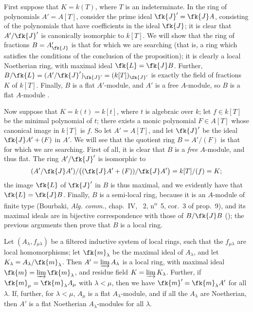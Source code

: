 \begin{env}[10.3.1.1]
\label{0.10.3.1.1}
First suppose that $K=k(T)$, where $T$ is an indeterminate.
In the ring of polynomials $A'=A[T]$, consider the prime ideal $\fk{J}'=\fk{J}A$, consisting of the
polynomials that have coefficients in the ideal $\fk{J}$;
it is clear that $A'/\fk{J}'$ is canonically isomorphic to $k[T]$.
We will show that the ring of fractions $B=A'_\fk{J}$ is that for which we are searching (that is, a ring which satisfies the conditions of the conclusion of the proposition);
it is clearly a local Noetherian ring, with maximal ideal $\fk{L}=\fk{J}B$.
Further, $B/\fk{L}=(A'/\fk{J}')_{\fk{J}'}=(k[T])_{\fk{J}'}$ is exactly the field of fractions $K$ of $k[T]$.
Finally, $B$ is a flat $A'$-module, and $A'$ is a free $A$-module, so $B$ is a flat $A$-module .
\end{env}

\begin{env}[10.3.1.2]
\label{0.10.3.1.2}
Now suppose that $K=k(t)=k[t]$, where $t$ is algebraic over $k$;
let $f\in k[T]$ be the minimal polynomial of $t$;
there exists a monic polynomial $F\in A[T]$ whose canonical image in $k[T]$ is $f$.
So let $A'=A[T]$, and let $\fk{J}'$ be the ideal $\fk{J}A'+(F)$ in $A'$.
We will see that the quotient ring $B=A'/(F)$ is that for which we are searching.
First of all, it is clear that $B$ is a \emph{free} $A$-module, and thus flat.
The ring $A'/\fk{J}'$ is isomorphic to
\[
(A'/\fk{J}A') / \big( (\fk{J}A'+(F))/\fk{J}A' \big) = k[T]/(f) = K;
\]
the image $\fk{L}$ of $\fk{J}'$ in $B$ is thus maximal, and we evidently have that $\fk{L}=\fk{J}B$.
Finally, $B$ is a semi-local ring, because it is an $A$-module of finite type (Bourbaki, \emph{Alg. comm.}, chap.~IV, \textsection~2, n\textsuperscript{o}~5, cor.~3 of prop.~9), and its maximal ideals are in bijective correspondence with those of $B/\fk{J}B$ (\cite[vol.~I, p.~259]{I-13});
the previous arguments then prove that $B$ is a local ring.
\end{env}

\begin{lem}[10.3.1.3]
\label{0.10.3.1.3}
Let $(A_\lambda,f_{\mu\lambda})$ be a filtered inductive system of local rings, such that the $f_{\mu\lambda}$ are local homomorphisms;
let $\fk{m}_\lambda$ be the maximal ideal of $A_\lambda$, and let $K_\lambda=A_\lambda/\fk{m}_\lambda$.
Then $A'=\varinjlim A_\lambda$ is a local ring, with maximal ideal $\fk{m}=\varinjlim\fk{m}_\lambda$, and residue field $K=\varinjlim K_\lambda$.
Further, if $\fk{m}_\mu=\fk{m}_\lambda A_\mu$ with $\lambda<\mu$, then we have $\fk{m}'=\fk{m}_\lambda A'$ for all $\lambda$.
If, further, for $\lambda<\mu$, $A_\mu$ is a flat $A_\lambda$-module, and if all the $A_\lambda$ are Noetherian, then $A'$ is a flat Noetherian $A_\lambda$-modules for all $\lambda$.
\end{lem}


